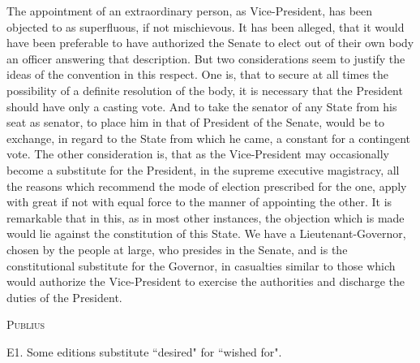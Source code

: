 The appointment of an extraordinary person, as Vice-President, has been objected to as superfluous, if not mischievous. It has been alleged, that it would have been preferable to have authorized the Senate to elect out of their own body an officer answering that description. But two considerations seem to justify the ideas of the convention in this respect. One is, that to secure at all times the possibility of a definite resolution of the body, it is necessary that the President should have only a casting vote. And to take the senator of any State from his seat as senator, to place him in that of President of the Senate, would be to exchange, in regard to the State from which he came, a constant for a contingent vote. The other consideration is, that as the Vice-President may occasionally become a substitute for the President, in the supreme executive magistracy, all the reasons which recommend the mode of election prescribed for the one, apply with great if not with equal force to the manner of appointing the other. It is remarkable that in this, as in most other instances, the objection which is made would lie against the constitution of this State. We have a Lieutenant-Governor, chosen by the people at large, who presides in the Senate, and is the constitutional substitute for the Governor, in casualties similar to those which would authorize the Vice-President to exercise the authorities and discharge the duties of the President.

\vspace{.5cm}
\textsc{Publius}

\vspace{1.5cm}

E1. Some editions substitute ``desired" for ``wished for".

